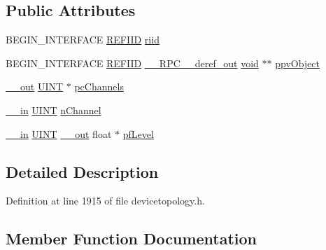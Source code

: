 \subsection*{Public Attributes}
\begin{DoxyCompactItemize}
\item 
B\+E\+G\+I\+N\+\_\+\+I\+N\+T\+E\+R\+F\+A\+CE \hyperlink{px__win__ds_8c_a80ec49c8ae61e234197d5071d2df497d}{R\+E\+F\+I\+ID} \hyperlink{struct_i_audio_peak_meter_vtbl_a9b2c38b623c060c59d2256b09fd5fdb5}{riid}
\item 
B\+E\+G\+I\+N\+\_\+\+I\+N\+T\+E\+R\+F\+A\+CE \hyperlink{px__win__ds_8c_a80ec49c8ae61e234197d5071d2df497d}{R\+E\+F\+I\+ID} \hyperlink{rpcsal_8h_a23bc188526f10656f9c79d950f6c3192}{\+\_\+\+\_\+\+R\+P\+C\+\_\+\+\_\+deref\+\_\+out} \hyperlink{sound_8c_ae35f5844602719cf66324f4de2a658b3}{void} $\ast$$\ast$ \hyperlink{struct_i_audio_peak_meter_vtbl_a23f7e6ad8d28bb683f7690dd20da96a3}{ppv\+Object}
\item 
\hyperlink{sal_8h_abb4c3c1135aab6c47cff22e7c16efb74}{\+\_\+\+\_\+out} \hyperlink{mapinls_8h_a36cb3b01d81ffd844bbbfb54003e06ec}{U\+I\+NT} $\ast$ \hyperlink{struct_i_audio_peak_meter_vtbl_aac7e84e32369101dab4bc0046996761d}{pc\+Channels}
\item 
\hyperlink{sal_8h_a3f6b8655e1aa9dfc15a9029f0343009e}{\+\_\+\+\_\+in} \hyperlink{mapinls_8h_a36cb3b01d81ffd844bbbfb54003e06ec}{U\+I\+NT} \hyperlink{struct_i_audio_peak_meter_vtbl_a0ba211092ef7b409220cbad3f7263105}{n\+Channel}
\item 
\hyperlink{sal_8h_a3f6b8655e1aa9dfc15a9029f0343009e}{\+\_\+\+\_\+in} \hyperlink{mapinls_8h_a36cb3b01d81ffd844bbbfb54003e06ec}{U\+I\+NT} \hyperlink{sal_8h_abb4c3c1135aab6c47cff22e7c16efb74}{\+\_\+\+\_\+out} float $\ast$ \hyperlink{struct_i_audio_peak_meter_vtbl_a53c2eccadec601ae9f46dc1dae997985}{pf\+Level}
\end{DoxyCompactItemize}


\subsection{Detailed Description}


Definition at line 1915 of file devicetopology.\+h.



\subsection{Member Function Documentation}
